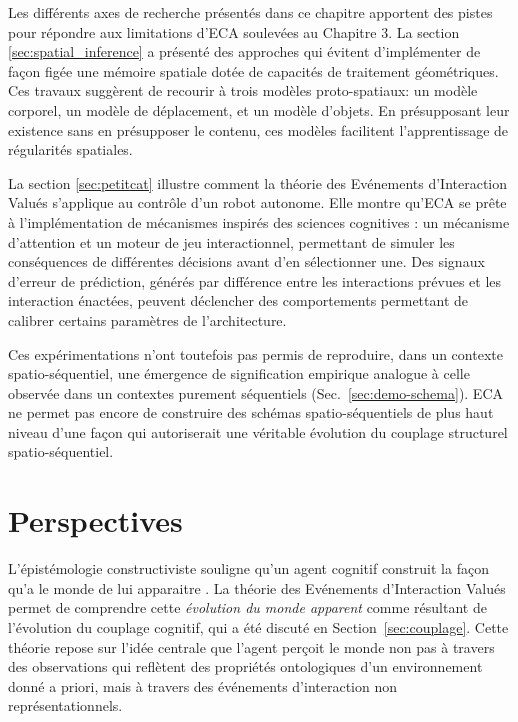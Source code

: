 Les différents axes de recherche présentés dans ce chapitre apportent des pistes pour répondre aux limitations d'ECA soulevées au Chapitre 3.
La section \ref{sec:spatial_inference} a présenté des approches qui évitent d'implémenter de façon figée une mémoire spatiale dotée de capacités de traitement géométriques. 
Ces travaux suggèrent de recourir à trois modèles proto-spatiaux: un modèle corporel, un modèle de déplacement, et un modèle d'objets.
En présupposant leur existence sans en présupposer le contenu, ces modèles facilitent l'apprentissage de régularités spatiales.  

La section \ref{sec:petitcat} illustre comment la théorie des Evénements d'Interaction Valués s'applique au contrôle d'un robot autonome. 
Elle montre qu'ECA se prête à l'implémentation de mécanismes inspirés des sciences cognitives : un mécanisme d'attention et un   moteur de jeu interactionnel, permettant de simuler les conséquences de différentes décisions avant d'en sélectionner une. 
Des signaux d'erreur de prédiction, générés par différence entre les interactions prévues et les interaction énactées, peuvent déclencher des comportements permettant de calibrer certains paramètres de l'architecture. 


Ces expérimentations n'ont toutefois pas permis de reproduire, dans un contexte spatio-séquentiel, une émergence de signification empirique analogue à celle observée dans un contextes purement séquentiels (Sec.~\ref{sec:demo-schema}).
ECA ne permet pas encore de construire des schémas spatio-séquentiels de plus haut niveau d'une façon qui autoriserait une véritable évolution du couplage structurel spatio-séquentiel.  











\chapter*{Perspectives}

\noindent
L'épistémologie constructiviste souligne qu'un agent cognitif \og construit la façon qu'a le monde de lui apparaitre \fg .
La théorie des Evénements d'Interaction Valués permet de comprendre cette \emph{évolution du monde apparent} comme résultant de l'évolution du couplage cognitif, qui a été discuté en Section~\ref{sec:couplage}.
Cette théorie repose sur l'idée centrale que l'agent perçoit le monde non pas à travers des observations qui reflètent des propriétés ontologiques d'un environnement donné a priori, mais à travers des événements d'interaction non représentationnels.  

